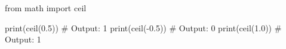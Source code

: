 \begin{unipdcode}[language=Python,numbers=none,xleftmargin=0pt,framexleftmargin=0pt]
from math import ceil

print(ceil(0.5))   # Output: 1
print(ceil(-0.5))  # Output: 0
print(ceil(1.0))   # Output: 1
\end{unipdcode}
